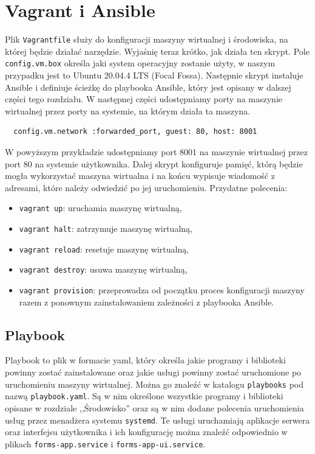 \section{Vagrant i Ansible}
Plik \texttt{Vagrantfile} służy do konfiguracji maszyny wirtualnej i środowiska,
na której będzie działać narzędzie. Wyjaśnię teraz krótko, jak działa ten 
skrypt. Pole \texttt{config.vm.box} określa jaki system operacyjny zostanie
użyty, w naszym przypadku jest to Ubuntu 20.04.4 LTS (Focal Fossa). 
Następnie skrypt instaluje Ansible i definiuje ścieżkę do playbooka Ansible,
który jest opisany w dalszej części tego rozdziału. W następnej części
udostępniamy porty na maszynie wirtualnej przez porty na systemie, na którym
działa ta maszyna.
\begin{verbatim}
  config.vm.network :forwarded_port, guest: 80, host: 8001
\end{verbatim}
W powyższym przykładzie udostępniamy port 8001 na maszynie wirtualnej
przez port 80 na systemie użytkownika. Dalej skrypt konfiguruje pamięć, którą
będzie mogła wykorzystać maszyna wirtualna i na końcu wypisuje wiadomość z adresami,
które należy odwiedzić po jej uruchomieniu. Przydatne polecenia:
\begin{itemize}
  \item \texttt{vagrant up}: uruchamia maszynę wirtualną,
  \item \texttt{vagrant halt}: zatrzymuje maszynę wirtualną,
  \item \texttt{vagrant reload}: resetuje maszynę wirtualną,
  \item \texttt{vagrant destroy}: usuwa maszynę wirtualną,
  \item \texttt{vagrant provision}: przeprowadza od początku proces konfiguracji
    maszyny razem z ponownym zainstalowaniem zależności z playbooka Ansible.
\end{itemize}

\subsection{Playbook}
Playbook to plik w formacie yaml, który określa jakie programy i biblioteki
powinny zostać zainstalowane oraz jakie usługi powinny zostać uruchomione po
uruchomieniu maszyny wirtualnej. Można go znaleźć w katalogu \texttt{playbooks}
pod nazwą \texttt{playbook.yaml}. Są w nim określone wszystkie programy
i biblioteki opisane w rozdziale ,,Środowisko'' oraz są w nim dodane polecenia
uruchomienia usług przez menadżera systemu \texttt{systemd}. Te usługi uruchamiają
aplikacje serwera oraz interfejsu użytkownika i ich konfigurację można znaleźć
odpowiednio w plikach \texttt{forms-app.service} i \texttt{forms-app-ui.service}.
